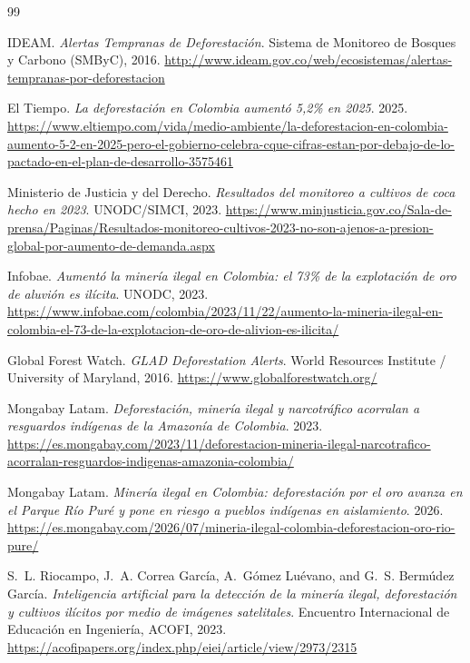 \documentclass{article}
\begin{document}
\begin{thebibliography}{99}

IDEAM. \textit{Alertas Tempranas de Deforestación}. Sistema de Monitoreo de
Bosques y Carbono (SMByC), 2016.
\url{http://www.ideam.gov.co/web/ecosistemas/alertas-tempranas-por-deforestacion}

El Tiempo. \textit{La deforestación en Colombia aumentó 5,2\% en 2025}. 2025.
\url{https://www.eltiempo.com/vida/medio-ambiente/la-deforestacion-en-colombia-aumento-5-2-en-2025-pero-el-gobierno-celebra-cque-cifras-estan-por-debajo-de-lo-pactado-en-el-plan-de-desarrollo-3575461}

Ministerio de Justicia y del Derecho. \textit{Resultados del monitoreo a
cultivos de coca hecho en 2023}. UNODC/SIMCI, 2023.
\url{https://www.minjusticia.gov.co/Sala-de-prensa/Paginas/Resultados-monitoreo-cultivos-2023-no-son-ajenos-a-presion-global-por-aumento-de-demanda.aspx}

Infobae. \textit{Aumentó la minería ilegal en Colombia: el 73\% de la
explotación de oro de aluvión es ilícita}. UNODC, 2023.
\url{https://www.infobae.com/colombia/2023/11/22/aumento-la-mineria-ilegal-en-colombia-el-73-de-la-explotacion-de-oro-de-alivion-es-ilicita/}

Global Forest Watch. \textit{GLAD Deforestation Alerts}. World Resources
Institute / University of Maryland, 2016.
\url{https://www.globalforestwatch.org/}

Mongabay Latam. \textit{Deforestación, minería ilegal y narcotráfico acorralan
a resguardos indígenas de la Amazonía de Colombia}. 2023.
\url{https://es.mongabay.com/2023/11/deforestacion-mineria-ilegal-narcotrafico-acorralan-resguardos-indigenas-amazonia-colombia/}

Mongabay Latam. \textit{Minería ilegal en Colombia: deforestación por el oro
avanza en el Parque Río Puré y pone en riesgo a pueblos indígenas en aislamiento}.
2026.
\url{https://es.mongabay.com/2026/07/mineria-ilegal-colombia-deforestacion-oro-rio-pure/}

S.~L. Riocampo, J.~A. Correa García, A.~Gómez Luévano, and G.~S. Bermúdez
García. \textit{Inteligencia artificial para la detección de la minería ilegal,
deforestación y cultivos ilícitos por medio de imágenes satelitales}.
Encuentro Internacional de Educación en Ingeniería, ACOFI, 2023.
\url{https://acofipapers.org/index.php/eiei/article/view/2973/2315}


\end{thebibliography}
\end{document}
